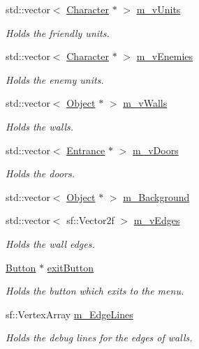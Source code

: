 \begin{DoxyCompactItemize}
std\+::vector$<$ \hyperlink{class_character}{Character} $\ast$ $>$ \hyperlink{class_game_aec7246808449949b669badf29d72d046}{m\+\_\+v\+Units}
\begin{DoxyCompactList}\small\item\em Holds the friendly units. \end{DoxyCompactList}\item 
std\+::vector$<$ \hyperlink{class_character}{Character} $\ast$ $>$ \hyperlink{class_game_a72a729d33e4e9b6b71268c0eb0213f08}{m\+\_\+v\+Enemies}
\begin{DoxyCompactList}\small\item\em Holds the enemy units. \end{DoxyCompactList}\item 
std\+::vector$<$ \hyperlink{class_object}{Object} $\ast$ $>$ \hyperlink{class_game_a8110aa194807a60497845a58c45cf61c}{m\+\_\+v\+Walls}
\begin{DoxyCompactList}\small\item\em Holds the walls. \end{DoxyCompactList}\item 
std\+::vector$<$ \hyperlink{class_entrance}{Entrance} $\ast$ $>$ \hyperlink{class_game_a6c2fd4a5ebeb11f1fd40e2e29c923241}{m\+\_\+v\+Doors}
\begin{DoxyCompactList}\small\item\em Holds the doors. \end{DoxyCompactList}\item 
std\+::vector$<$ \hyperlink{class_object}{Object} $\ast$ $>$ \hyperlink{class_game_a68c93d94e737a7275342677098716d30}{m\+\_\+\+Background}
\item 
std\+::vector$<$ sf\+::\+Vector2f $>$ \hyperlink{class_game_a7399cd144cc40c1de9c8cd3c7a83c5d8}{m\+\_\+v\+Edges}
\begin{DoxyCompactList}\small\item\em Holds the wall edges. \end{DoxyCompactList}\item 
\hyperlink{class_button}{Button} $\ast$ \hyperlink{class_game_ae44f63e1fe7763c689956acf2ea0c512}{exit\+Button}
\begin{DoxyCompactList}\small\item\em Holds the button which exits to the menu. \end{DoxyCompactList}\item 
sf\+::\+Vertex\+Array \hyperlink{class_game_a2b3db353c1e39c1950bf71a787a87992}{m\+\_\+\+Edge\+Lines}
\begin{DoxyCompactList}\small\item\em Holds the debug lines for the edges of walls. \end{DoxyCompactList}\end{DoxyCompactItemize}


